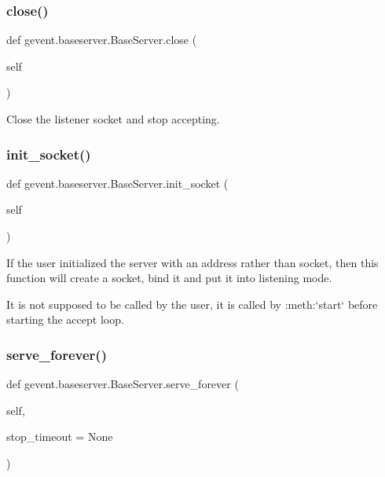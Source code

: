 \subsubsection{\texorpdfstring{close()}{close()}}
{\footnotesize\ttfamily def gevent.\+baseserver.\+Base\+Server.\+close (\begin{DoxyParamCaption}\item[{}]{self }\end{DoxyParamCaption})}

\begin{DoxyVerb}Close the listener socket and stop accepting.\end{DoxyVerb}
 \mbox{\label{classgevent_1_1baseserver_1_1_base_server_ae80a885199589a0bf16ba5c586ad6e7b}} 
\subsubsection{\texorpdfstring{init\+\_\+socket()}{init\_socket()}}
{\footnotesize\ttfamily def gevent.\+baseserver.\+Base\+Server.\+init\+\_\+socket (\begin{DoxyParamCaption}\item[{}]{self }\end{DoxyParamCaption})}

\begin{DoxyVerb}If the user initialized the server with an address rather than socket,
then this function will create a socket, bind it and put it into listening mode.

It is not supposed to be called by the user, it is called by :meth:`start` before starting
the accept loop.\end{DoxyVerb}
 \mbox{\label{classgevent_1_1baseserver_1_1_base_server_a3f6e831866a64795bed63a9b9e944f03}} 
\subsubsection{\texorpdfstring{serve\+\_\+forever()}{serve\_forever()}}
{\footnotesize\ttfamily def gevent.\+baseserver.\+Base\+Server.\+serve\+\_\+forever (\begin{DoxyParamCaption}\item[{}]{self,  }\item[{}]{stop\+\_\+timeout = {\ttfamily None} }\end{DoxyParamCaption})}

